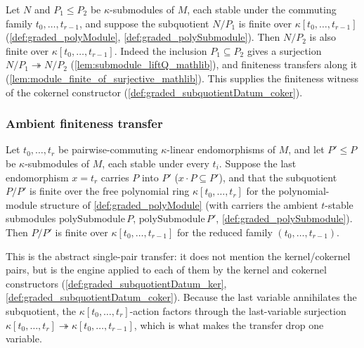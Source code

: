 \begin{lemma}\leanok
  \label{lem:graded_polyQuot_finite_of_le_denominator}
  Let \(N\) and \(P_1 \le P_2\) be \(\kappa\)-submodules of \(M\), each stable under
  the commuting family \(t_0, \dots, t_{r-1}\), and suppose the subquotient
  \(N/P_1\) is finite over \(\kappa[t_0, \dots, t_{r-1}]\)
  (\cref{def:graded_polyModule}, \cref{def:graded_polySubmodule}). Then \(N/P_2\) is
  also finite over \(\kappa[t_0, \dots, t_{r-1}]\). Indeed the inclusion
  \(P_1 \subseteq P_2\) gives a surjection \(N/P_1 \twoheadrightarrow N/P_2\)
  (\cref{lem:submodule_liftQ_mathlib}), and finiteness transfers along it
  (\cref{lem:module_finite_of_surjective_mathlib}). This supplies the
  finiteness witness of the cokernel constructor
  (\cref{def:graded_subquotientDatum_coker}).
\end{lemma}

\subsubsection*{Ambient finiteness transfer}

\begin{lemma}\leanok
  \label{lem:graded_subquotient_finite_transfer}
  Let \(t_0, \dots, t_r\) be pairwise-commuting \(\kappa\)-linear endomorphisms of
  \(M\), and let \(P' \le P\) be \(\kappa\)-submodules of \(M\), each stable under
  every \(t_i\). Suppose the last endomorphism \(x = t_r\) carries \(P\) into \(P'\)
  (\(x \cdot P \subseteq P'\)), and that the subquotient \(P/P'\) is finite over the
  free polynomial ring \(\kappa[t_0, \dots, t_r]\) for the polynomial-module structure
  of \cref{def:graded_polyModule} (with carriers the ambient \(t\)-stable submodules
  \(\mathrm{polySubmodule}\,P\), \(\mathrm{polySubmodule}\,P'\),
  \cref{def:graded_polySubmodule}). Then \(P/P'\) is finite over
  \(\kappa[t_0, \dots, t_{r-1}]\) for the reduced family \((t_0, \dots, t_{r-1})\).

  This is the abstract single-pair transfer: it does not mention the kernel/cokernel
  pairs, but is the engine applied to each of them by the kernel and cokernel
  constructors (\cref{def:graded_subquotientDatum_ker},
  \cref{def:graded_subquotientDatum_coker}). Because the last variable
  annihilates the subquotient, the \(\kappa[t_0, \dots, t_r]\)-action factors through
  the last-variable surjection \(\kappa[t_0, \dots, t_r] \twoheadrightarrow
  \kappa[t_0, \dots, t_{r-1}]\), which is what makes the transfer drop one variable.
\end{lemma}

